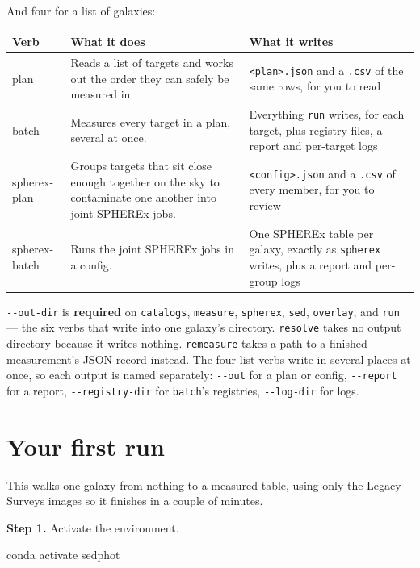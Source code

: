 \documentclass[11pt]{article}
\newcommand{\cmdline}[1]{\begin{cmd}\ttfamily #1\end{cmd}}
\begin{document}
And four for a list of galaxies:

\begin{longtable}{T{2.5cm} L{4.6cm} L{6.9cm}}
\toprule
\textbf{\normalfont Verb} & \textbf{What it does} & \textbf{What it writes} \\
\midrule
\endhead
plan & Reads a list of targets and works out the order they can safely
  be measured in. & \texttt{<plan>.json} and a \texttt{.csv} of the same
  rows, for you to read \\[2pt]
batch & Measures every target in a plan, several at once. &
  Everything \texttt{run} writes, for each target, plus registry files,
  a report and per-target logs \\[2pt]
spherex-plan & Groups targets that sit close enough together on the sky
  to contaminate one another into joint SPHEREx jobs. &
  \texttt{<config>.json} and a \texttt{.csv} of every member, for you to
  review \\[2pt]
spherex-batch & Runs the joint SPHEREx jobs in a config. &
  One SPHEREx table per galaxy, exactly as \texttt{spherex} writes,
  plus a report and per-group logs \\
\bottomrule
\end{longtable}

\texttt{-{}-out-dir} is \textbf{required} on \texttt{catalogs},
\texttt{measure}, \texttt{spherex}, \texttt{sed}, \texttt{overlay}, and
\texttt{run} --- the six verbs that write into one galaxy's directory.
\texttt{resolve} takes no output directory because it writes nothing.
\texttt{remeasure} takes a path to a finished measurement's JSON record
instead. The four list verbs write in several places at once, so each
output is named separately: \texttt{-{}-out} for a plan or config,
\texttt{-{}-report} for a report, \texttt{-{}-registry-dir} for
\texttt{batch}'s registries, \texttt{-{}-log-dir} for logs.

\section{Your first run}

This walks one galaxy from nothing to a measured table, using only the
Legacy Surveys images so it finishes in a couple of minutes.

\textbf{Step 1.} Activate the environment.

\cmdline{conda activate sedphot}
\end{document}
